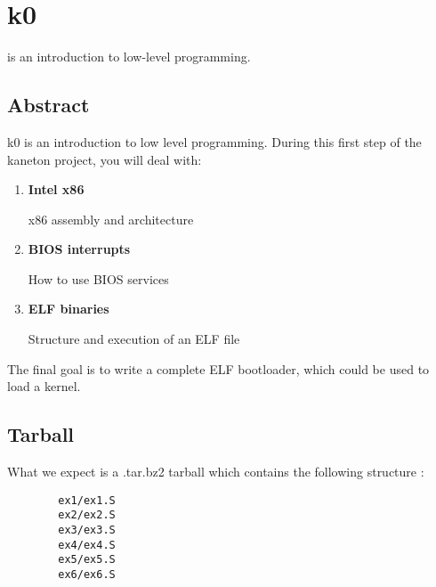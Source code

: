 %
%
%
%
%
%

%
%

\chapter{k0}
\label{chapter:k0}

 is an introduction to low-level programming.

\newpage

%
%

\section{Abstract}

k0 is an introduction to low level programming. During this first step of
the kaneton project, you will deal with:

\begin{enumerate}
  \item
    {\bf Intel x86}

    x86 assembly and architecture
  \item
    {\bf BIOS interrupts}

    How to use BIOS services
  \item
    {\bf ELF binaries}

    Structure and execution of an ELF file
\end{enumerate}

The final goal is to write a complete ELF bootloader, which could be used to
load a kernel.

\clearpage

\section{Tarball}

What we expect is a .tar.bz2 tarball which contains the following structure :
\begin{verbatim}
        ex1/ex1.S
        ex2/ex2.S
        ex3/ex3.S
        ex4/ex4.S
        ex5/ex5.S
        ex6/ex6.S
\end{verbatim}

